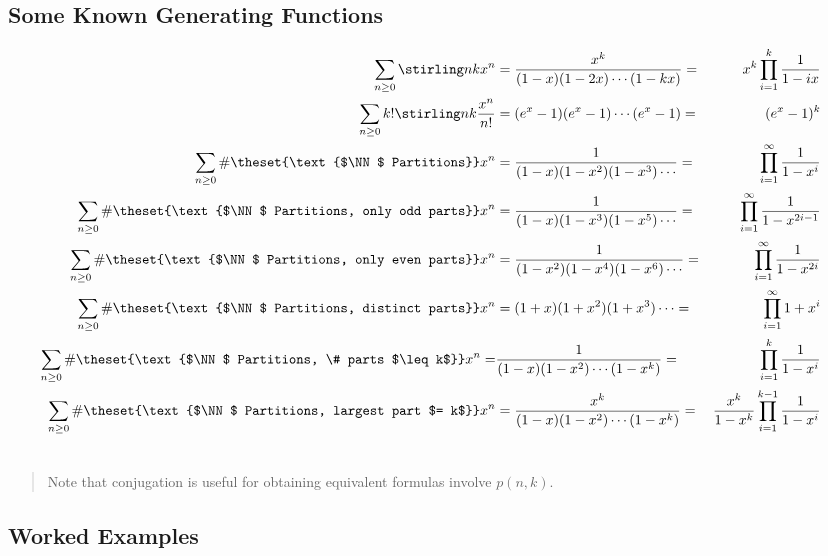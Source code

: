 \hypertarget{some-known-generating-functions}{%
\subsection{Some Known Generating
Functions}\label{some-known-generating-functions}}

\[\begin{aligned}
\sum_{n\geq 0} \stirling n k x^n &= \frac{x^k}{(1-x)(1-2x)\cdots(1-kx)} =& x^k\prod_{i=1}^k \frac 1 {1-ix} \\
\sum_{n\geq 0} k! \stirling n k \frac{x^n}{n!} &= (e^x-1)(e^x-1)\cdots(e^x-1) =& (e^x-1)^k \\
\sum_{n\geq 0} \#\theset{\text{$\NN$ Partitions}} x^n &= \frac{1}{(1-x)(1-x^2)(1-x^3)\cdots} =& \prod_{i=1}^\infty \frac 1 {1-x^i} \\
\sum_{n\geq 0} \#\theset{\text{$\NN$ Partitions, only odd parts}} x^n &= \frac{1}{(1-x)(1-x^3)(1-x^5)\cdots} =& \prod_{i=1}^\infty \frac{1}{1-x^{2i-1}} \\
\sum_{n\geq 0} \#\theset{\text{$\NN$ Partitions, only even parts}} x^n &= \frac{1}{(1-x^2)(1-x^4)(1-x^6)\cdots} =& \prod_{i=1}^\infty \frac{1}{1-x^{2i}} \\
\sum_{n\geq 0} \#\theset{\text{$\NN$ Partitions, distinct parts}} x^n &= {(1+x)(1+x^2)(1+x^3)\cdots} =& \prod_{i=1}^{\infty} {1+x^i} \\
\sum_{n\geq 0} \#\theset{\text{$\NN$ Partitions, \# parts $\leq k$}} x^n =& \frac{1}{(1-x)(1-x^2)\cdots(1-x^k)} =& \prod_{i=1}^{k} \frac 1 {1-x^i}  &\\
\sum_{n\geq 0} \#\theset{\text{$\NN$ Partitions, largest part $= k$}} x^n &= \frac{x^k}{(1-x)(1-x^2)\cdots(1-x^k)} =& \frac{x^k}{1-x^k}\prod_{i=1}^{k-1} \frac 1 {1-x^i} \\
\
\end{aligned} 
\]

\begin{quote}
Note that conjugation is useful for obtaining equivalent formulas
involve \(p(n, k)\).
\end{quote}

\hypertarget{worked-examples}{%
\subsection{Worked Examples}\label{worked-examples}}

